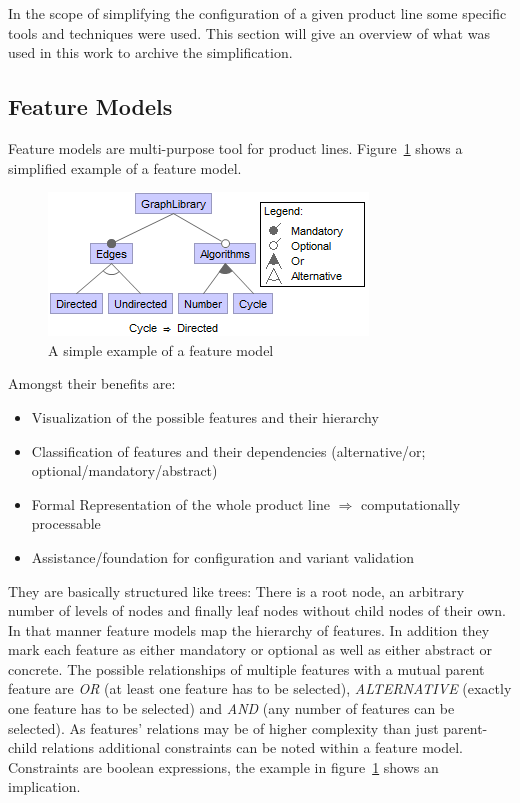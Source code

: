 In the scope of simplifying the configuration of a given product line some specific tools and techniques were used. This section will give an overview of what was used in this work to archive the simplification.

\subsection{Feature Models}
Feature models are multi-purpose tool for product lines. Figure~\ref{img-fm} shows a simplified example of a feature model.
\begin{figure}
	\includegraphics{img/img-fm.png}
	\caption{A simple example of a feature model}
	\label{img-fm}
\end{figure}
Amongst their benefits are:
\begin{itemize}
\item Visualization of the possible features and their hierarchy
\item Classification of features and their dependencies (alternative/or; optional/mandatory/abstract)
\item Formal Representation of the whole product line $\Rightarrow$ computationally processable
\item Assistance/foundation for configuration and variant validation
\end{itemize}
They are basically structured like trees: There is a root node, an arbitrary number of levels of nodes and finally leaf nodes without child nodes of their own. In that manner feature models map the hierarchy of features. In addition they mark each feature as either mandatory or optional as well as either abstract or concrete. The possible relationships of multiple features with a mutual parent feature are \textit{OR} (at least one feature has to be selected), \textit{ALTERNATIVE} (exactly one feature has to be selected) and \textit{AND} (any number of features can be selected). As features' relations may be of higher complexity than just parent-child relations additional constraints can be noted within a feature model. Constraints are boolean expressions, the example in figure~\ref{img-fm} shows an implication.

